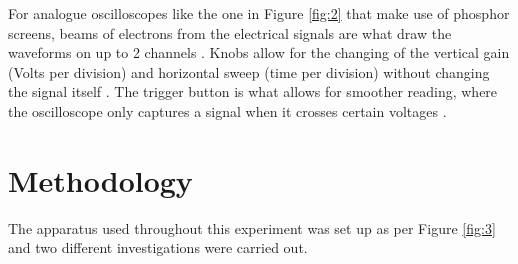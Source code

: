 \documentclass[12pt]{article}
\begin{document}
For analogue oscilloscopes like the one in Figure \ref{fig:2} that make use of phosphor screens, beams of electrons from the electrical signals are what draw the waveforms on up to 2 channels \cite{oscil101}.
Knobs allow for the changing of the vertical gain (Volts per division) and horizontal sweep (time per division) without changing the signal itself \cite{UCDoscilloscope,oscil101}.
The trigger button is what allows for smoother reading, where the oscilloscope only captures a signal when it crosses certain voltages \cite{oscil101}.

\newpage

\section{Methodology} \label{sec:2}

The apparatus used throughout this experiment was set up as per Figure \ref{fig:3} and two different investigations were carried out.
\end{document}
